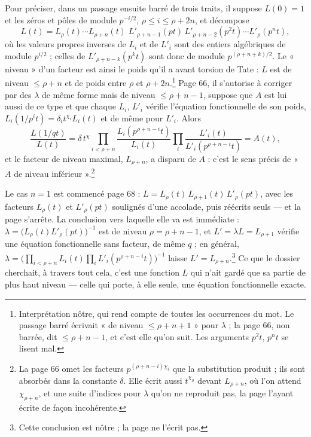 \documentclass[11pt,a4paper]{article}
\begin{document}
Pour préciser, dans un passage ensuite barré de trois traits, il suppose
$L(0) = 1$ et les zéros et pôles de module $p^{-i/2}$, $\rho \le i \le \rho + 2n$,
et décompose
\[
  L(t) = L_\rho(t)\cdots L_{\rho+n}(t)\;
         L'_{\rho+n-1}(pt)\,L'_{\rho+n-2}(p^2t)\cdots L'_\rho(p^nt),
\]
où les valeurs propres inverses de $L_i$ et de $L'_i$ sont des entiers
algébriques de module $p^{i/2}$ ; celles de $L'_{\rho+n-k}(p^kt)$ sont donc de
module $p^{(\rho+n+k)/2}$. Le « niveau » d'un facteur est ainsi le poids qu'il
a avant torsion de Tate : $L$ est de niveau $\le \rho + n$ et de poids entre
$\rho$ et $\rho + 2n$.\footnote{Interprétation nôtre, qui rend compte de
toutes les occurrences du mot. Le passage barré écrivait « de niveau
$\le \rho + n + 1$ » pour $\lambda$ ; la page 66, non barrée, dit
$\le \rho + n - 1$, et c'est elle qu'on suit. Les arguments $p^2t$, $p^nt$ se
lisent mal.} Page 66, il s'autorise à corriger par des $\lambda$ de même forme
mais de niveau $\le \rho + n - 1$, suppose que $A$ est lui aussi de ce type et
que chaque $L_i$, $L'_i$ vérifie l'équation fonctionnelle de son poids,
$L_i(1/p^it) = \delta_i t^{\chi_i}L_i(t)$ et de même pour $L'_i$. Alors
\[
  \frac{L(1/qt)}{L(t)} = \delta\,t^{\chi}
  \prod_{i<\rho+n}\frac{L_i(p^{\rho+n-i}t)}{L_i(t)}
  \prod_{i}\frac{L'_i(t)}{L'_i(p^{\rho+n-i}t)} = A(t),
\]
et le facteur de niveau maximal, $L_{\rho+n}$, a disparu de $A$ : c'est le sens
précis de « $A$ de niveau inférieur ».\footnote{La page 66 omet les facteurs
$p^{(\rho+n-i)\chi_i}$ que la substitution produit ; ils sont absorbés dans la
constante $\delta$. Elle écrit aussi $t^{\chi_\rho}$ devant $L_{\rho+n}$, où
l'on attend $\chi_{\rho+n}$, et une suite d'indices pour $\lambda$ qu'on ne
reproduit pas, la page l'ayant écrite de façon incohérente.}

Le cas $n = 1$ est commencé page 68 : $L = L_\rho(t)\,L_{\rho+1}(t)\,L'_\rho(pt)$,
avec les facteurs $L_\rho(t)$ et $L'_\rho(pt)$ soulignés d'une accolade,
puis réécrits seuls --- et la page s'arrête. La conclusion vers laquelle elle
va est immédiate : $\lambda = \bigl(L_\rho(t)L'_\rho(pt)\bigr)^{-1}$ est de
niveau $\rho = \rho + n - 1$, et $L' = \lambda L = L_{\rho+1}$ vérifie une
équation fonctionnelle sans facteur, de même $q$ ; en général,
$\lambda = \bigl(\prod_{i<\rho+n}L_i(t)\prod_i L'_i(p^{\rho+n-i}t)\bigr)^{-1}$
laisse $L' = L_{\rho+n}$.\footnote{Cette conclusion est nôtre ; la page ne
l'écrit pas.} Ce que le dossier cherchait, à travers tout cela, c'est une
fonction $L$ qui n'ait gardé que sa partie de plus haut niveau --- celle qui
porte, à elle seule, une équation fonctionnelle exacte.
\end{document}
